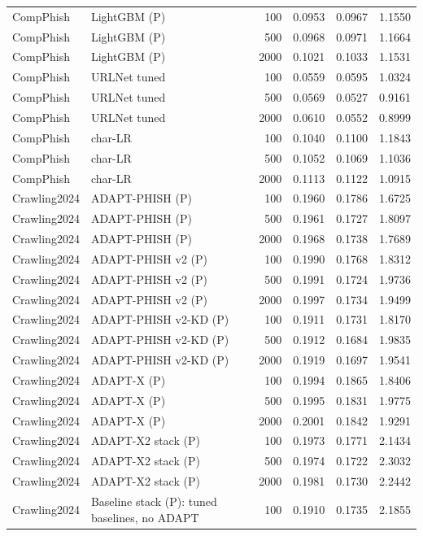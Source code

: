 \begin{table}[t]
\begin{tabular}{llrrrr}
CompPhish & LightGBM (P) & 100 & 0.0953 & 0.0967 & 1.1550 \\
CompPhish & LightGBM (P) & 500 & 0.0968 & 0.0971 & 1.1664 \\
CompPhish & LightGBM (P) & 2000 & 0.1021 & 0.1033 & 1.1531 \\
CompPhish & URLNet tuned & 100 & 0.0559 & 0.0595 & 1.0324 \\
CompPhish & URLNet tuned & 500 & 0.0569 & 0.0527 & 0.9161 \\
CompPhish & URLNet tuned & 2000 & 0.0610 & 0.0552 & 0.8999 \\
CompPhish & char-LR & 100 & 0.1040 & 0.1100 & 1.1843 \\
CompPhish & char-LR & 500 & 0.1052 & 0.1069 & 1.1036 \\
CompPhish & char-LR & 2000 & 0.1113 & 0.1122 & 1.0915 \\
Crawling2024 & ADAPT-PHISH (P) & 100 & 0.1960 & 0.1786 & 1.6725 \\
Crawling2024 & ADAPT-PHISH (P) & 500 & 0.1961 & 0.1727 & 1.8097 \\
Crawling2024 & ADAPT-PHISH (P) & 2000 & 0.1968 & 0.1738 & 1.7689 \\
Crawling2024 & ADAPT-PHISH v2 (P) & 100 & 0.1990 & 0.1768 & 1.8312 \\
Crawling2024 & ADAPT-PHISH v2 (P) & 500 & 0.1991 & 0.1724 & 1.9736 \\
Crawling2024 & ADAPT-PHISH v2 (P) & 2000 & 0.1997 & 0.1734 & 1.9499 \\
Crawling2024 & ADAPT-PHISH v2-KD (P) & 100 & 0.1911 & 0.1731 & 1.8170 \\
Crawling2024 & ADAPT-PHISH v2-KD (P) & 500 & 0.1912 & 0.1684 & 1.9835 \\
Crawling2024 & ADAPT-PHISH v2-KD (P) & 2000 & 0.1919 & 0.1697 & 1.9541 \\
Crawling2024 & ADAPT-X (P) & 100 & 0.1994 & 0.1865 & 1.8406 \\
Crawling2024 & ADAPT-X (P) & 500 & 0.1995 & 0.1831 & 1.9775 \\
Crawling2024 & ADAPT-X (P) & 2000 & 0.2001 & 0.1842 & 1.9291 \\
Crawling2024 & ADAPT-X2 stack (P) & 100 & 0.1973 & 0.1771 & 2.1434 \\
Crawling2024 & ADAPT-X2 stack (P) & 500 & 0.1974 & 0.1722 & 2.3032 \\
Crawling2024 & ADAPT-X2 stack (P) & 2000 & 0.1981 & 0.1730 & 2.2442 \\
Crawling2024 & Baseline stack (P): tuned baselines, no ADAPT & 100 & 0.1910 & 0.1735 & 2.1855 \\

\end{tabular}
\end{table}
